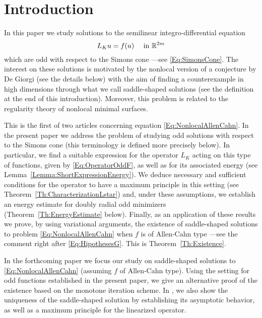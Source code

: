 \section{Introduction}
\label{Sec:Introduction}


In this paper we study solutions to the semilinear integro-differential equation
\begin{equation}
\label{Eq:NonlocalAllenCahn}
L_K u = f(u) \quad \textrm{ in } \mathbb{R}^{2m}
\end{equation}
which are odd with respect to the Simons cone ---see \eqref{Eq:SimonsCone}. The interest on these solutions is motivated by the nonlocal version of a conjecture by De Giorgi (see the details below) with the aim of finding a counterexample in high dimensions through what we call saddle-shaped solutions (see the definition at the end of this introduction). Moreover, this problem is related to the regularity theory of nonlocal minimal surfaces.

This is the first of two articles concerning equation \eqref{Eq:NonlocalAllenCahn}. In the present paper we address the problem of studying odd solutions with respect to the Simons cone (this terminology is  defined more precisely below). In particular, we find a suitable expression for the operator $L_K$  acting on this type of functions, given by \eqref{Eq:OperatorOddF}, as well as for its associated energy (see Lemma~\ref{Lemma:ShortExpressionEnergy}). We deduce necessary and sufficient conditions for the operator to have a maximum principle in this setting (see Theorem~\ref{Th:CharacterizationLstar}) and, under these assumptions, we establish an energy estimate for doubly radial odd minimizers (Theorem~\ref{Th:EnergyEstimate} below). Finally, as an application of these results we prove, by using variational arguments, the existence of saddle-shaped solutions to problem \eqref{Eq:NonlocalAllenCahn} when $f$ is of Allen-Cahn type ---see the comment right after \eqref{Eq:HipothesesG}. This is Theorem~\ref{Th:Existence}.

In the forthcoming paper \cite{FelipeSanz-Perela:IntegroDifferentialII} we focus our study on saddle-shaped solutions to \eqref{Eq:NonlocalAllenCahn} (assuming $f$ of Allen-Cahn type). Using the setting for odd functions established in the present paper, we give an alternative proof of the existence based on the monotone iteration scheme. In \cite{FelipeSanz-Perela:IntegroDifferentialII}, we also show the uniqueness of the saddle-shaped solution by establishing its asymptotic behavior, as well as a maximum principle for the linearized operator.


